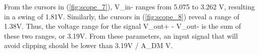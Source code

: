 \FloatBarrier

From the cursors in (\ref{fig:scope_7}), V_{in-} ranges from 5.075 to 3.262 \si{\volt}, resulting in a swing of 1.81\si{\volt}.
Similarly, the cursors in (\ref{fig:scope_8}) reveal a range of 1.38\si{\volt}.
Thus, the voltage range for the signal V_{out+} - V_{out-} is the sum of these two ranges, or 3.19\si{\volt}.
From these parameters, an input signal that will avoid clipping should be lower than 3.19\si{\volt} / A_{DM}  \si{\volt}.